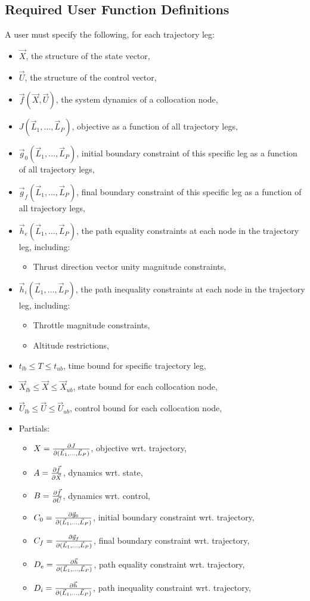 \subsection{Required User Function Definitions}
A user must specify the following, for each trajectory leg:
\begin{itemize}
\item $\vec{X}$, the structure of the state vector,
\item $\vec{U}$, the structure of the control vector,
\item $\vec{f}(\vec{X},\vec{U})$, the system dynamics of a collocation node,
\item $J(\vec{L}_1, \dots, \vec{L}_P)$, objective as a function of all trajectory legs,
\item $\vec{g}_{0}(\vec{L}_1, \dots, \vec{L}_P)$, initial boundary constraint of this specific leg as a function of all trajectory legs,
\item $\vec{g}_{f}(\vec{L}_1, \dots, \vec{L}_P)$, final boundary constraint of this specific leg as a function of all trajectory legs,
\item $\vec{h}_e(\vec{L}_1, \dots, \vec{L}_P)$, the path equality constraints at each node in the trajectory leg, including:
\begin{itemize}
\item Thrust direction vector unity magnitude constraints,
\end{itemize}
\item $\vec{h}_i(\vec{L}_1, \dots, \vec{L}_P)$, the path inequality constraints at each node in the trajectory leg,  including:
\begin{itemize}
\item Throttle magnitude constraints,
\item Altitude restrictions,
\end{itemize}
\item $t_{lb} \leq T \leq t_{ub}$, time bound for specific trajectory leg,
\item $\vec{X}_{lb} \leq \vec{X} \leq \vec{X}_{ub}$, state bound for each collocation node,
\item $\vec{U}_{lb} \leq \vec{U} \leq \vec{U}_{ub}$, control bound for each collocation node,
\item Partials:
\begin{itemize}
\item $X = \pdv{J}{(\vec{L}_1, \dots, \vec{L}_P)}$, objective wrt. trajectory,
\item $A = \pdv{\vec{f}}{\vec{X}}$, dynamics wrt. state,
\item $B = \pdv{\vec{f}}{\vec{U}}$, dynamics wrt. control,
\item $C_0 = \pdv{\vec{g}_0}{(\vec{L}_1, \dots, \vec{L}_P)}$, initial boundary constraint wrt. trajectory,
\item $C_f = \pdv{\vec{g}_f}{(\vec{L}_1, \dots, \vec{L}_P)}$, final boundary constraint wrt. trajectory,
\item $D_e = \pdv{\vec{h}}{(\vec{L}_1, \dots, \vec{L}_P)}$, path equality constraint wrt. trajectory,
\item $D_i = \pdv{\vec{h}}{(\vec{L}_1, \dots, \vec{L}_P)}$, path inequality constraint wrt. trajectory,
\end{itemize}
\end{itemize}

